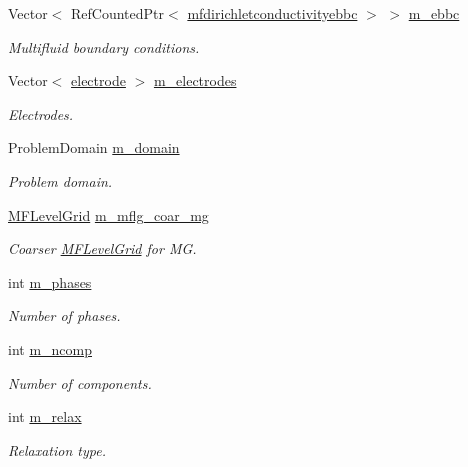 \begin{DoxyCompactItemize}
Vector$<$ Ref\+Counted\+Ptr$<$ \hyperlink{classmfdirichletconductivityebbc}{mfdirichletconductivityebbc} $>$ $>$ \hyperlink{classmfconductivityop_aabaeff374933bb75d87b14cd89bf0932}{m\+\_\+ebbc}
\begin{DoxyCompactList}\small\item\em Multifluid boundary conditions. \end{DoxyCompactList}\item 
Vector$<$ \hyperlink{classelectrode}{electrode} $>$ \hyperlink{classmfconductivityop_a23b9c25289b1c76ba0d453998cd242fa}{m\+\_\+electrodes}
\begin{DoxyCompactList}\small\item\em Electrodes. \end{DoxyCompactList}\item 
Problem\+Domain \hyperlink{classmfconductivityop_a81af5abd904311676580b75924abfda1}{m\+\_\+domain}
\begin{DoxyCompactList}\small\item\em Problem domain. \end{DoxyCompactList}\item 
\hyperlink{classMFLevelGrid}{M\+F\+Level\+Grid} \hyperlink{classmfconductivityop_a71bca3ce242732d534ce68d377633f25}{m\+\_\+mflg\+\_\+coar\+\_\+mg}
\begin{DoxyCompactList}\small\item\em Coarser \hyperlink{classMFLevelGrid}{M\+F\+Level\+Grid} for MG. \end{DoxyCompactList}\item 
int \hyperlink{classmfconductivityop_aafdf99ae10b89727afa1a4b2d76fd946}{m\+\_\+phases}
\begin{DoxyCompactList}\small\item\em Number of phases. \end{DoxyCompactList}\item 
int \hyperlink{classmfconductivityop_a494378c20603e8b8cbdb6f411d89d83a}{m\+\_\+ncomp}
\begin{DoxyCompactList}\small\item\em Number of components. \end{DoxyCompactList}\item 
int \hyperlink{classmfconductivityop_a612bdd7edd7c7d9763de32bf360e15f7}{m\+\_\+relax}
\begin{DoxyCompactList}\small\item\em Relaxation type. \end{DoxyCompactList}\item 

\end{DoxyCompactItemize}
